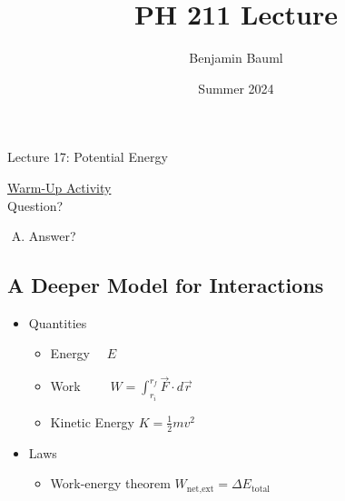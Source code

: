 \documentclass[]{article}
\title{PH 211 Lecture \Week}
\author{Benjamin Bauml}
\date{Summer 2024}
\newcommand{\Week}{17}
\begin{document}
\begin{TeacherMargin}

\end{TeacherMargin}
\begin{PresentSpace}
\begin{center}
	\huge Lecture \Week: Potential Energy
\end{center}
\vspace{0.5cm}
\underline{Warm-Up Activity} \\
Question?
\begin{enumerate}[(A)]
	\item Answer?
\end{enumerate}
\end{PresentSpace}
\newpage
\begin{TeacherMargin}

\end{TeacherMargin}
\begin{PresentSpace}
\vspace{-10pt}
\section*{A Deeper Model for Interactions}
\vspace{-10pt}
\begin{itemize}
	\item Quantities
	\begin{itemize}
		\item Energy \qquad \qquad \qquad \quad \ \ $E$
		\item Work \qquad \qquad \qquad \quad \ \ \ \ $W = \int_{r_{i}}^{r_{f}}\vec{F}\cdot d\vec{r}$
		\item Kinetic Energy \qquad \qquad $K=\frac{1}{2}mv^{2}$
	\end{itemize}
	\item Laws
	\begin{itemize}
		\item Work-energy theorem \quad $W_{\text{net,ext}} = \Delta E_{\text{total}}$
	\end{itemize}
\end{itemize}
\end{PresentSpace}
\newpage
\begin{TeacherMargin}

\end{TeacherMargin}
\end{document}

